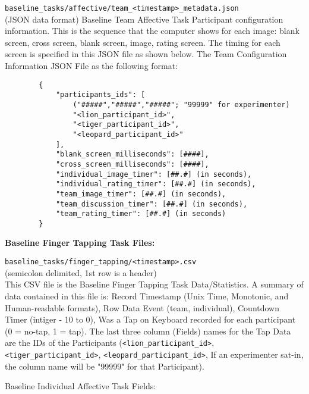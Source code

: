 \begin{description}
\medskip
\item\verb|baseline_tasks/affective/team_<timestamp>_metadata.json|\\
    (JSON data format) Baseline Team Affective Task Participant configuration
    information. This is the sequence that the computer shows for each image:
    blank screen, cross screen, blank screen, image, rating screen. The timing
    for each screen is specified in this JSON file as shown below.  The Team
    Configuration Information JSON File as the following format:
    \begin{verbatim}
        {
            "participants_ids": [
                ("#####","#####","#####"; "99999" for experimenter)
                "<lion_participant_id>",
                "<tiger_participant_id>",
                "<leopard_participant_id>"
            ],
            "blank_screen_milliseconds": [####],
            "cross_screen_milliseconds": [####],
            "individual_image_timer": [##.#] (in seconds),
            "individual_rating_timer": [##.#] (in seconds),
            "team_image_timer": [##.#] (in seconds),
            "team_discussion_timer": [##.#] (in seconds),
            "team_rating_timer": [##.#] (in seconds)
        }
    \end{verbatim}



\bigskip\item\textbf{Baseline Finger Tapping Task Files:}
\medskip
\item\verb|baseline_tasks/finger_tapping/<timestamp>.csv|\\
    (semicolon delimited, 1st row is a header)\\
    This CSV file is the Baseline Finger Tapping Task Data/Statistics. A
    summary of data contained in this file is: Record Timestamp (Unix Time,
    Monotonic, and Human-readable formats), Row Data Event (team, individual),
    Countdown Timer (intiger - 10 to 0), Was a Tap on Keyboard recorded for
    each participant (0 = no-tap, 1 = tap). The last three column (Fields)
    names for the Tap Data are the IDs of the Participants
    (\verb|<lion_participant_id>|, \verb|<tiger_participant_id>|,
    \verb|<leopard_participant_id>|, If an experimenter sat-in, the column name
    will be "99999" for that Participant).

\noindent Baseline Individual Affective Task Fields:


\end{description}

